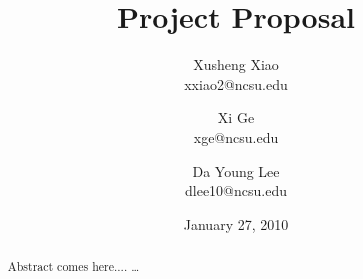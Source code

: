 \documentclass[times, 10pt,onecolumn]{article}
\title{Project Proposal}
\author{
Xusheng Xiao\\
\small{xxiao2@ncsu.edu}\\
\and
Xi Ge\\
\small{xge@ncsu.edu}\\
\and
Da Young Lee\\
\small{dlee10@ncsu.edu}
}
\date{January 27, 2010}
\begin{document}
\maketitle
\thispagestyle{empty}
\pagestyle{empty}

\begin{abstract}
Abstract comes here....
\ldots
\end{abstract}











\end{document}
